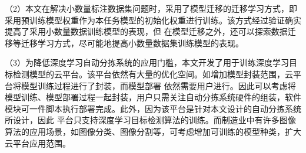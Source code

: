 （2）本文在解决小数量标注数据集问题时，采用了模型迁移的迁移学习方式，即采用预训练模型权重作为本任务模型的初始化权重进行训练。该方式经过验证确实提高了采用小数量数据训练模型的表现，但
在模型迁移之外，还可以探索数据迁移等迁移学习方式，尽可能地提高小数量数据集训练模型的表现。

（3）为降低深度学习自动分拣系统的应用门槛，本文开发了用于训练深度学习目标检测模型的云平台。该平台依然有大量的优化空间。如增加模型封装范围，云平台将模型训练过程进行了封装，而模型部署
依然需要用户进行。因此可以考虑将模型训练、模型部署过程一起封装，用户只需关注自动分拣系统硬件的组装，软件模块可一件脚本执行部署完成。此外，因为该平台是针对本文设计的自动分拣系统所设计，因此
平台只支持深度学习目标检测算法的训练。而制造业中有许多图像算法的应用场景，如图像分类、图像分割等，可考虑增加可训练的模型种类，扩大云平台应用范围。